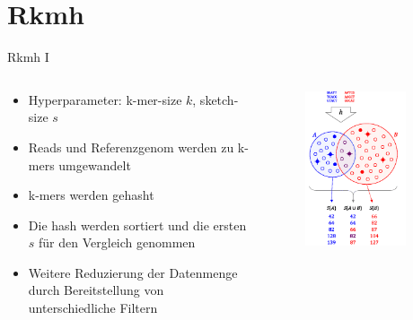 \section{Rkmh}

\begin{frame}{Rkmh I}
    \begin{columns} %
        \begin{column}{.60\textwidth}
            \begin{itemize}
                \item Hyperparameter: k-mer-size $ k $, sketch-size $ s $
                \item Reads und Referenzgenom werden zu k-mers umgewandelt
                \item k-mers werden gehasht
                \item Die hash werden sortiert und die ersten $ s $ für den Vergleich genommen
                \item Weitere Reduzierung der Datenmenge durch Bereitstellung von unterschiedliche Filtern
            \end{itemize}
        \end{column}
        \hfill
        \begin{column}{.40\textwidth}
            \begin{figure}[H]
                \centering
                \includegraphics[width=0.85\textwidth]{images/mash_similarity.png} 

\end{figure}
\end{column}
\end{columns}
\end{frame}
